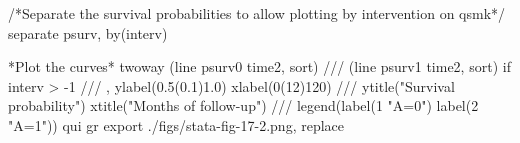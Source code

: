 \documentclass[
  10pt,
  a4paper,
]{book}
\newenvironment{Shaded}{\begin{snugshade}}{\end{snugshade}}
\newcommand{\BaseNTok}[1]{\textcolor[rgb]{0.68,0.00,0.00}{#1}}
\newcommand{\CommentTok}[1]{\textcolor[rgb]{0.37,0.37,0.37}{#1}}
\newcommand{\KeywordTok}[1]{\textcolor[rgb]{0.00,0.46,0.62}{#1}}
\newcommand{\NormalTok}[1]{\textcolor[rgb]{0.00,0.46,0.62}{#1}}
\newcommand{\StringTok}[1]{\textcolor[rgb]{0.13,0.47,0.30}{#1}}
\begin{document}
\begin{Shaded}
\begin{Highlighting}[]
\CommentTok{/*Separate the survival probabilities to allow plotting by }
\CommentTok{intervention on qsmk*/}
\KeywordTok{separate}\NormalTok{ psurv, }\KeywordTok{by}\NormalTok{(interv)}

\NormalTok{*Plot the curves*}
\KeywordTok{twoway}\NormalTok{ (}\KeywordTok{line}\NormalTok{ psurv0 time2, }\KeywordTok{sort}\NormalTok{) }\CommentTok{///}
\NormalTok{  (}\KeywordTok{line}\NormalTok{ psurv1 time2, }\KeywordTok{sort}\NormalTok{) }\KeywordTok{if}\NormalTok{ interv \textgreater{} {-}1 }\CommentTok{///}
\NormalTok{  , }\KeywordTok{ylabel}\NormalTok{(0.5(0.1)1.0) }\KeywordTok{xlabel}\NormalTok{(0(12)120) }\CommentTok{///}
  \BaseNTok{ytitle}\NormalTok{(}\StringTok{"Survival probability"}\NormalTok{) }\BaseNTok{xtitle}\NormalTok{(}\StringTok{"Months of follow{-}up"}\NormalTok{) }\CommentTok{///}
  \BaseNTok{legend}\NormalTok{(}\KeywordTok{label}\NormalTok{(1 }\StringTok{"A=0"}\NormalTok{) }\KeywordTok{label}\NormalTok{(2 }\StringTok{"A=1"}\NormalTok{))}
\KeywordTok{qui} \KeywordTok{gr} \KeywordTok{export}\NormalTok{ ./figs/stata{-}fig{-}17{-}2.png, }\KeywordTok{replace}
\end{Highlighting}
\end{Shaded}
\end{document}
